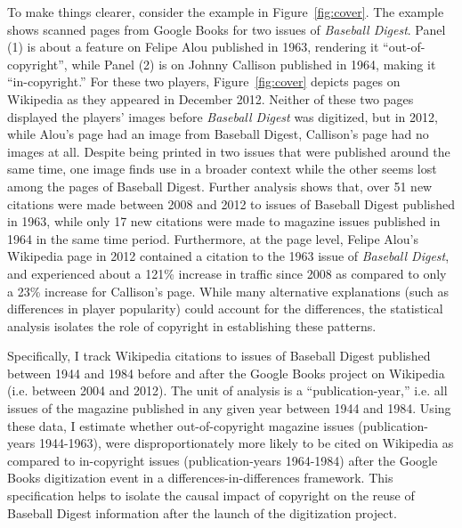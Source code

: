 \documentclass[11pt]{article}
\begin{document}
To make things clearer, consider the example in Figure~\ref{fig:cover}. The example shows scanned pages from Google Books for two issues of \emph{Baseball Digest}. Panel (1) is about a feature on Felipe Alou published in 1963, rendering it ``out-of-copyright'', while Panel (2) is on Johnny Callison published in 1964, making it ``in-copyright.'' For these two players, Figure~\ref{fig:cover} depicts pages on Wikipedia as they appeared in December 2012. Neither of these two pages displayed the players' images before \emph{Baseball Digest} was digitized, but in 2012, while Alou's page had an image from Baseball Digest, Callison's page had no images at all. Despite being printed in two issues that were published around the same time, one image finds use in a broader context while the other seems lost among the pages of Baseball Digest. Further analysis shows that, over 51 new citations were made between 2008 and 2012 to issues of Baseball Digest published in 1963, while only 17 new citations were made to magazine issues published in 1964 in the same time period. Furthermore, at the page level, Felipe Alou's Wikipedia page in 2012 contained a citation to the 1963 issue of \emph{Baseball Digest}, and experienced about a 121\% increase in traffic since 2008 as compared to only a 23\% increase for Callison's page. While many alternative explanations (such as differences in player popularity) could account for the differences, the statistical analysis isolates the role of copyright in establishing these patterns.

Specifically, I track Wikipedia citations to issues of Baseball Digest published between 1944 and 1984 before and after the Google Books project on Wikipedia (i.e. between 2004 and 2012). The unit of analysis is a ``publication-year,'' i.e. all issues of the magazine published in any given year between 1944 and 1984. Using these data, I estimate whether out-of-copyright magazine issues (publication-years 1944-1963), were disproportionately more likely to be cited on Wikipedia as compared to in-copyright issues (publication-years 1964-1984) after the Google Books digitization event in a differences-in-differences framework. This specification helps to isolate the causal impact of copyright on the reuse of Baseball Digest information after the launch of the digitization project. 
\end{document}
